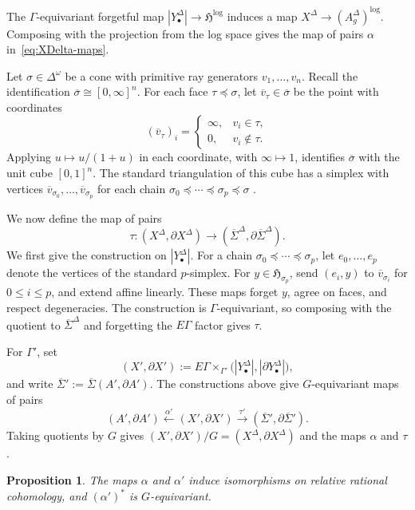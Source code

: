 \documentclass[12 pt]{amsart}
\newcommand{\fH}{\mathfrak H}
\newcommand{\<}{\langle}
\renewcommand{\>}{\rangle}
\newtheorem{proposition}[theorem]{Proposition}
\theoremstyle{definition}
\begin{document}
\noindent The $\Gamma$-equivariant forgetful map $|Y_\bullet^\Delta| \to \fH^{\log}$ induces a map $X^\Delta \to (A_g^\Delta)^{\log}$. Composing with the projection from the log space gives the map of pairs $\alpha$ in~\eqref{eq:XDelta-maps}.

Let $\sigma \in \Delta^\omega$ be a cone with primitive ray generators $v_1, \ldots, v_n$. Recall the identification $\overline \sigma \cong [0, \infty]^n$. For each face $\tau \preceq \sigma$, let $\overline v_\tau \in \overline \sigma$ be the point with coordinates
\[
(\overline v_\tau)_i = \begin{cases}
\infty, & v_i \in \tau, \\
0, & v_i \notin \tau.
\end{cases}
\]
Applying $u \mapsto u/(1 + u)$ in each coordinate, with $\infty \mapsto 1$, identifies $\overline \sigma$ with the unit cube $[0, 1]^n$. The standard triangulation of this cube has a simplex with vertices $\overline v_{\sigma_0}, \ldots, \overline v_{\sigma_p}$ for each chain $\sigma_0 \preceq \cdots \preceq \sigma_p \preceq \sigma$ \cite[\S2.5]{ACP}.

We now define the map of pairs
\[
\tau\colon (X^\Delta,\partial X^\Delta)
\longrightarrow
(\overline\Sigma^\Delta,\partial\overline\Sigma^\Delta).
\]
We first give the construction on $|Y_\bullet^\Delta|$. For a chain $\sigma_0\preceq\cdots\preceq\sigma_p$, let $e_0,\ldots,e_p$ denote the vertices of the standard $p$-simplex. For $y \in \fH_{\sigma_p}$, send $(e_i, y)$ to $\overline v_{\sigma_i}$ for $0 \leq i \leq p$, and extend affine linearly. These maps forget $y$, agree on faces, and respect degeneracies. The construction is $\Gamma$-equivariant, so composing with the quotient to $\overline\Sigma^\Delta$ and forgetting the $E\Gamma$ factor gives $\tau$.

For $\Gamma'$, set
\[
(X', \partial X') := E \Gamma \times_{\Gamma'} \bigl(|Y_\bullet^\Delta|, |\partial Y_\bullet^\Delta|\bigr),
\]
and write $\overline\Sigma' := \overline\Sigma(A', \partial A')$. The constructions above give $G$-equivariant maps of pairs
\[
(A', \partial A') \xleftarrow{\alpha'} (X', \partial X') \xrightarrow{\tau'} (\overline\Sigma', \partial\overline\Sigma').
\]
Taking quotients by $G$ gives $(X', \partial X')/G = (X^\Delta, \partial X^\Delta)$ and the maps $\alpha$ and $\tau$.

\begin{proposition}\label{thm:relative-toroidal-resolution}
The maps $\alpha$ and $\alpha'$ induce isomorphisms on relative rational cohomology, and $(\alpha')^*$ is $G$-equivariant.
\end{proposition}
\end{document}
